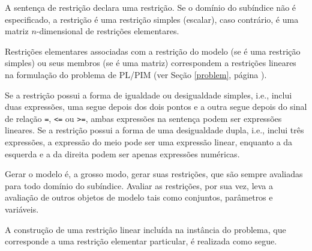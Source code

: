 \documentclass[11pt, brazil]{report}
\begin{document}

A sentença de restrição declara uma restrição. Se o domínio do subíndice
não é especificado, a restrição é uma restrição simples (escalar),
caso contrário, é uma matriz $n$-dimensional de restrições elementares.

Restrições elementares associadas com a restrição do modelo (se é
uma restrição simples) ou seus membros (se é uma matriz) correspondem
a restrições lineares na formulação do problema de PL/PIM (ver
Seção \ref{problem}, página \pageref{problem}).

Se a restrição possui a forma de igualdade ou desigualdade simples, i.e.,
inclui duas expressões, uma segue depois dos dois pontos e a outra
segue depois do sinal de relação {\tt=}, {\tt<=} ou {\tt>=}, \linebreak ambas
expressões na sentença podem ser expressões lineares. Se a restrição
possui a forma de uma \linebreak desigualdade dupla, i.e., inclui três expressões,
a expressão do meio pode ser uma expressão linear, enquanto a da
esquerda e a da direita podem ser apenas expressões numéricas.

Gerar o modelo é, a grosso modo, gerar suas restrições, que são sempre
avaliadas para todo domínio do subíndice. Avaliar as restrições,
por sua vez, leva a avaliação de outros objetos de modelo tais como
conjuntos, parâmetros e variáveis.

A construção de uma restrição linear incluída na instância do problema,
que corresponde a uma restrição elementar particular, é realizada
como segue.
\end{document}

